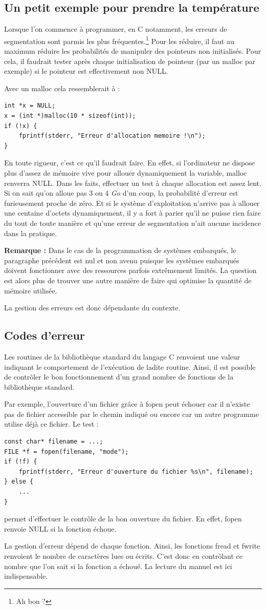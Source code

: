 \documentclass[../../../main.tex]{subfiles}
\begin{document}
\subsection{Un petit exemple pour prendre la température}
Lorsque l'on commence à programmer, en C notamment, les erreurs de segmentation sont parmis
les plus fréquentes.\footnote{Ah bon ?} Pour les réduire, il faut au maximum réduire les probabilités de manipuler des
pointeurs non initialisés. Pour cela, il faudrait tester après chaque initialisation de pointeur (par un
malloc par exemple) si le pointeur est effectivement non \textsf{NULL}.

Avec un malloc cela ressemblerait à :
\begin{verbatim}
int *x = NULL;
x = (int *)malloc(10 * sizeof(int));
if (!x) {
	fprintf(stderr, "Erreur d'allocation memoire !\n");
}
\end{verbatim}
En toute rigueur, c'est ce qu'il faudrait faire. En effet, si l'ordinateur ne dispose plus d'assez de mémoire
vive pour allouer dynamiquement la variable, malloc renverra \textsf{NULL}. Dans les faits, effectuer un test à
chaque allocation est assez lent. Si on sait qu'on alloue pas 3 ou 4 \textit{Go} d'un coup, la probabilité d'erreur
est furieusement proche de zéro. Et si le système d'exploitation n'arrive pas à allouer une centaine
d'octets dynamiquement, il y a fort à parier qu'il ne puisse rien faire du tout de toute manière et
qu'une erreur de segmentation n'ait aucune incidence dans la pratique.

\textbf{Remarque :} Dans le cas de la programmation de systèmes embarqués, le paragraphe précédent
est nul et non avenu puisque les systèmes embarqués doivent fonctionner avec des ressources parfois
extrêmement limités. La question est alors plus de trouver une autre manière de faire qui optimise la
quantité de mémoire utilisée.

La gestion des erreurs est donc dépendante du contexte.
\subsection{Codes d'erreur}
Les routines de la bibliothèque standard du langage C renvoient une valeur indiquant le comportement
de l'exécution de ladite routine. Ainsi, il est possible de contrôler le bon fonctionnement d'un grand nombre de fonctions de la bibliothèque standard.

Par exemple, l'ouverture d'un fichier grâce à \textsf{fopen} peut échouer car il n'existe pas de fichier accessible
par le chemin indiqué ou encore car un autre programme utilise déjà ce fichier. Le test :
\begin{verbatim}
const char* filename = ...;
FILE *f = fopen(filename, "mode");
if (!f) {
	fprintf(stderr, "Erreur d'ouverture du fichier %s\n", filename);
} else {
	...
}
\end{verbatim}
permet d'effectuer le contrôle de la bon ouverture du fichier. En effet, \textsf{fopen} renvoie \textsf{NULL} si la fonction
échoue.

La gestion d'erreur dépend de chaque fonction. Ainsi, les fonctions \textsf{fread} et \textsf{fwrite} renvoient le nombre
de caractères lues ou écrits. C'est donc en contrôlant ce nombre que l'on sait si la fonction a échoué.
La lecture du manuel est ici indispensable.
\end{document}
